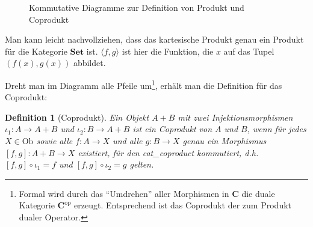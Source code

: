\documentclass[11pt, a4paper, bibgerm]{scrbook}
\newcommand\abb{}
\newcommand\ato{\rightarrow} %
\newtheorem{defini}{Definition}
\newcommand{\defi}[2]{%
  \begin{defini}[#1]
    \label{def:#1}
    #2
  \end{defini}
}
\begin{document}
\begin{figure}[h]
  \centering
  \caption{Kommutative Diagramme zur Definition von Produkt und Coprodukt}
\end{figure}

Man kann leicht nachvollziehen, dass das kartesische Produkt genau ein
Produkt für die Kategorie $\mathbf{Set}$ ist. $\langle f,g \rangle$ ist
hier die Funktion, die $x$ auf das Tupel $(f(x), g(x))$ abbildet.

Dreht man im Diagramm alle Pfeile um\footnote{Formal wird durch das
  ``Umdrehen'' aller Morphismen in $\mathbf{C}$ die duale Kategorie
  $\mathbf{C}^{\mathrm{op}}$ erzeugt. Entsprechend ist das Coprodukt der
  zum Produkt dualer Operator.}, erhält man die Definition für das
Coprodukt:

\defi{Coprodukt}{ Ein Objekt $A + B$ mit zwei Injektionsmorphismen
  $\iota_1 : A \ato A + B$ und $\iota_2 : B \ato A + B$ ist ein
  Coprodukt von $A$ und $B$, wenn für jedes $X \in \mathrm{Ob}$ sowie
  alle $f : A \ato X$ und alle $g : B \ato X$ genau ein Morphismus
  $[f,g] : A + B \ato X$ existiert, für den \abb{cat_coproduct}
  kommutiert, d.h.  $[f,g] \circ \iota_1 = f$ und $[f,g] \circ \iota_2 =
  g$ gelten.  }
\end{document}
